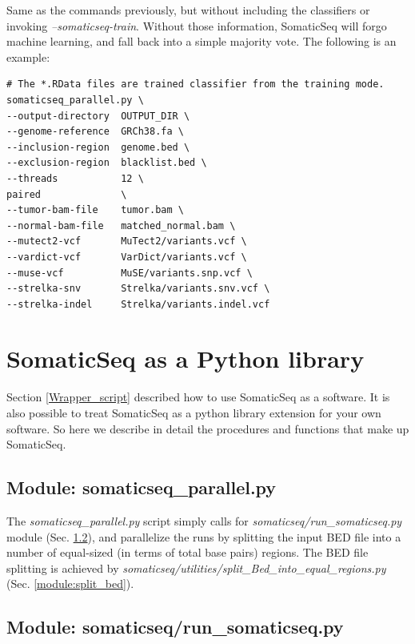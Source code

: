 \documentclass[10pt,letterpaper]{article}
\begin{document}
\begin{sloppypar}
Same as the commands previously, but without including the classifiers or invoking \textit{--somaticseq-train}. Without those information, SomaticSeq will forgo machine learning, and fall back into a simple majority vote. The following is an example:

\begin{lstlisting}
# The *.RData files are trained classifier from the training mode.
somaticseq_parallel.py \
--output-directory  OUTPUT_DIR \
--genome-reference  GRCh38.fa \
--inclusion-region  genome.bed \
--exclusion-region  blacklist.bed \
--threads           12 \
paired              \
--tumor-bam-file    tumor.bam \
--normal-bam-file   matched_normal.bam \
--mutect2-vcf       MuTect2/variants.vcf \
--vardict-vcf       VarDict/variants.vcf \
--muse-vcf          MuSE/variants.snp.vcf \
--strelka-snv       Strelka/variants.snv.vcf \
--strelka-indel     Strelka/variants.indel.vcf
\end{lstlisting}







\section{SomaticSeq as a Python library} \label{somaticseq_package}


Section \ref{Wrapper_script} described how to use SomaticSeq as a software. It is also possible to treat SomaticSeq as a python library extension for your own software. So here we describe in detail the procedures and functions that make up SomaticSeq. 
 

\subsection{Module: somaticseq\_parallel.py} \label{module:somaticseq_parallel}

The \emph{somaticseq\_parallel.py} script simply calls for \emph{somaticseq/run\_somaticseq.py} module (Sec. \ref{module:run_somaticseq}), and parallelize the runs by splitting the input BED file into a number of equal-sized (in terms of total base pairs) regions. The BED file splitting is achieved by \emph{somaticseq/utilities/split\_Bed\_into\_equal\_regions.py} (Sec. \ref{module:split_bed}).


\subsection{Module: somaticseq/run\_somaticseq.py} \label{module:run_somaticseq}


\end{sloppypar}
\end{document}

